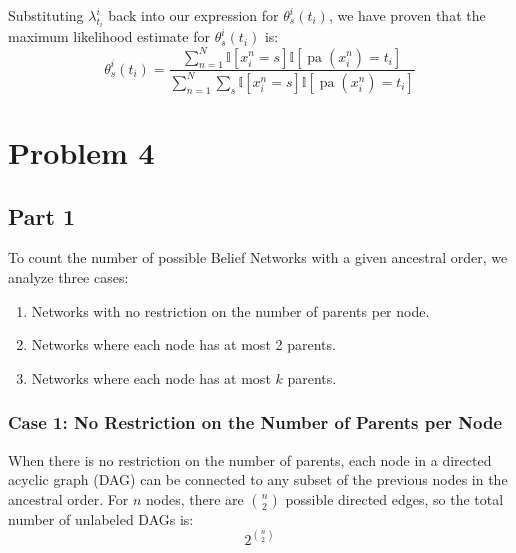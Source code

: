 \documentclass{article}
\begin{document}

Substituting \( \lambda_{t_i}^i \) back into our expression for \( \theta_s^i(t_i) \),
 we have proven that the maximum likelihood estimate for \( \theta_s^i(t_i) \) is:
\[
\theta_s^i(t_i) = \frac{\sum_{n=1}^N \mathbb{I}\left[x_i^n = s\right] \mathbb{I}\left[\operatorname{pa}(x_i^n) = t_i\right]}{\sum_{n=1}^N \sum_s \mathbb{I}\left[x_i^n = s\right] \mathbb{I}\left[\operatorname{pa}(x_i^n) = t_i\right]}
\]







\section*{Problem 4}

\subsection*{Part 1}

To count the number of possible Belief Networks with a given ancestral order, we analyze three cases:
\begin{enumerate}
    \item Networks with no restriction on the number of parents per node.
    \item Networks where each node has at most 2 parents.
    \item Networks where each node has at most \( k \) parents.
\end{enumerate}


\subsubsection*{Case 1: No Restriction on the Number of Parents per Node}

When there is no restriction on the number of parents, each node in a directed acyclic graph (DAG) can be connected to any subset of the previous nodes in the ancestral order. For \( n \) nodes, there are \( \binom{n}{2} \) possible directed edges, so the total number of unlabeled DAGs is:
\[
2^{\binom{n}{2}}
\]
\end{document}
